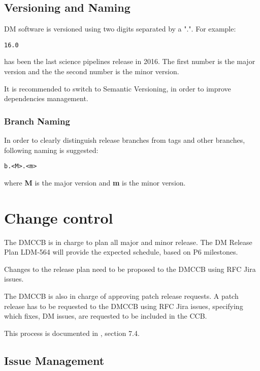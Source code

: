 \newpage
\subsection{Versioning and Naming} \label{sect:versioning}

DM software is versioned using two digits separated by a ".".
For example:

\begin{verbatim}
16.0
\end{verbatim}

has been the last science pipelines release in 2016. The first number is the major version and the the second number is the minor version. 


It is recommended to switch to Semantic Versioning, in order to improve dependencies management.


\subsubsection{Branch Naming}

In order to clearly distinguish release branches from tags and other branches, following naming is suggested:

\begin{verbatim}
b.<M>.<m>
\end{verbatim}

where {\bf M} is the major version and {\bf m} is the minor version.


\newpage
\section{Change control} \label{sect:changecontrol}

The DMCCB is in charge to plan all major and minor release.
The DM Release Plan LDM-564 will provide the expected schedule, based on P6 milestones.

Changes to the release plan need to be proposed to the DMCCB using RFC Jira issues.

The DMCCB is also in charge of approving patch release requests.
A patch release has to be requested to the DMCCB using RFC Jira issues, specifying which fixes, DM issues, are requested to be included in the CCB.

This process is documented in , section 7.4.


\subsection{Issue Management} \label{sect:issues}


